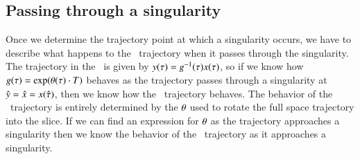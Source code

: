 


\subsection{Passing through a singularity}
\label{sect:passingSing}

Once we determine the trajectory point at which a singularity occurs,
we have to describe what happens to the \reducedsp\ trajectory
when it passes through the singularity.
The trajectory in the \reducedsp\ is given by
$y(\tau)=g^{-1}(\tau) x(\tau)$,
so if we know how $g(\tau)=\exp({{\bf \theta}(\tau) \cdot T})$
behaves as the trajectory passes through a singularity at
$\hat{y} =  \hat{x} = x(\hat{\tau})$,
then we know how the \reducedsp\ trajectory behaves.
The behavior of the \reducedsp\ trajectory is entirely
determined by the ${\bf \theta}$ used to rotate the full space trajectory
into the slice. If we can find an expression for ${\bf \theta}$ as the trajectory approaches a singularity then we know the behavior of the \reducedsp\ trajectory as it approaches a singularity.

